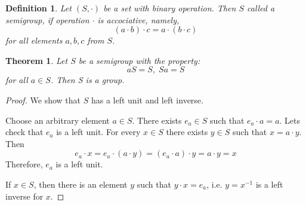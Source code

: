 \documentclass{article}
\newtheorem{definition}{Definition}
\newtheorem{thm}{Theorem}
\begin{document}
\begin{definition}
    Let $(S, \cdot)$ be a set with binary operation. 
    Then $S$ called a semigroup, if operation $\cdot$ is accociative, namely,
    \[
        (a\cdot b)\cdot c= a\cdot (b\cdot c)
        \] 
    for all elements $a, b, c$ from $S$.
\end{definition}

\begin{thm}
    Let $S$ be a semigroup with the property:
    \[
        aS = S,\;Sa=S    
    \]
    for all $a\in S$. Then S is a group.
\end{thm}
\begin{proof}
    We show that $S$ has a left unit and left inverse.

    Choose an arbitrary element $a\in S$. There exists $e_a\in S$ such that $e_a\cdot a = a$.
    Lets check that $e_a$ is a left unit. For every $x\in S$ there exists 
    $y\in S$ such that $x = a\cdot y$. Then
    \[
        e_a\cdot x = e_a\cdot(a\cdot y) = (e_a\cdot a)\cdot y=a\cdot y=x
        \]
    Therefore, $e_a$ is a left unit.

    If $x\in S$, then there is an element $y$ such that $y\cdot x=e_a$, i.e. $y=x^{-1}$
    is a left inverse for $x$.
\end{proof}
\end{document}
